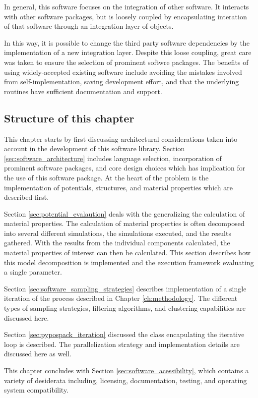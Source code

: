 In general, this software focuses on the integration of other software.  It interacts with other software packages, but is loosely coupled by encapsulating interation of that software through an integration layer of objects.

In this way, it is possible to change the third party software dependencies by the implementation of a new integration layer.  Despite this loose coupling, great care was taken to ensure the selection of prominent softwre packages.  The benefits of using widely-accepted existing software include avoiding the mistakes involved from self-implementation, saving development effort, and that the underlying routines have sufficient documentation and support.

\subsection{Structure of this chapter}

This chapter starts by first discussing architectural considerations taken into account in the development of this software library.  Section \ref{sec:software_architecture} includes language selection, incorporation of prominent software packages, and core design choices which has implication for the use of this software package.  At the heart of the problem is the implementation of potentials, structures, and material properties which are described first.

Section \ref{sec:potential_evalaution} deals with the generalizing the calculation of material properties.  The calculation of material properties is often decomposed into several different simulations, the simulations executed, and the results gathered.  With the results from the individual components calculated, the material properties of interest can then be calculated.  This section describes how this model decomposition is implemented and the execution framework evaluating a single parameter.

Section \ref{sec:software_sampling_strategies} describes implementation of a single iteration of the process described in Chapter \ref{ch:methodology}.  The different types of sampling strategies, filtering algorithms, and clustering capabilities are discussed here.

Section \ref{sec:pypospack_iteration} discussed the class encapulating the iterative loop is described.  The parallelization strategy and implementation details are discussed here as well.

This chapter concludes with Section \ref{sec:software_acessibility}, which contains a variety of desiderata including, licensing, documentation, testing, and operating system compatibility.

